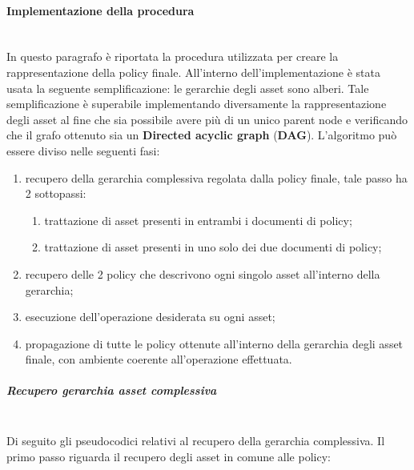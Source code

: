 \documentclass[12pt,a4paper,twoside]{book}
\begin{document}
\paragraph{Implementazione della procedura}\mbox{}\\
In questo paragrafo è riportata la procedura utilizzata per creare la rappresentazione della policy finale. All'interno dell'implementazione è stata usata la seguente semplificazione: le gerarchie degli asset sono alberi. Tale semplificazione è superabile implementando diversamente la rappresentazione degli asset al fine che sia possibile avere più di un unico parent node e verificando che il grafo ottenuto sia un \textbf{Directed acyclic graph} (\textbf{DAG}).
L'algoritmo può essere diviso nelle seguenti fasi:
\begin{enumerate}
	\item recupero della gerarchia complessiva regolata dalla policy finale, tale passo ha 2 sottopassi:
	\begin{enumerate}
		\item trattazione di asset presenti in entrambi i documenti di policy;
		\item trattazione di asset presenti in uno solo dei due documenti di policy;
	\end{enumerate}
	\item recupero delle 2 policy che descrivono ogni singolo asset all'interno della gerarchia;
	\item esecuzione dell'operazione desiderata su ogni asset;
	\item propagazione di tutte le policy ottenute all'interno della gerarchia degli asset finale, con ambiente coerente all'operazione effettuata.
\end{enumerate}
\subparagraph{Recupero gerarchia asset complessiva}\mbox{}\\
Di seguito gli pseudocodici relativi al recupero della gerarchia complessiva. Il primo passo riguarda il recupero degli asset in comune alle policy:
\end{document}
